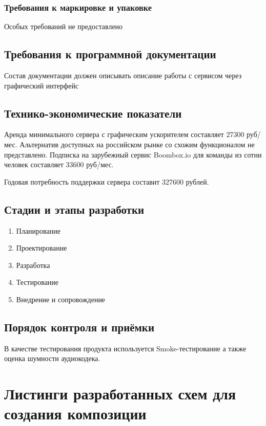 \documentclass[14pt]{extarticle}
\begin{document}
\subsubsection{Требования к маркировке и упаковке}

Особых требований не предоставлено

\subsection{Требования к программной документации}

Состав документации должен описывать описание работы с сервисом через графический интерфейс

\subsection{Технико-экономические показатели}

Аренда минимального сервера с графическим ускорителем составляет 27300 руб/мес.
Альтернатив доступных на российском рынке со схожим функционалом не представлено. Подписка на
зарубежный сервис Boombox.io для команды из сотни человек составляет 33600 руб/мес.

Годовая потребность поддержки сервера составит 327600 рублей.

\subsection{Стадии и этапы разработки}

\begin{enumerate}
	\item Планирование
	\item Проектирование
	\item Разработка
	\item Тестирование
	\item Внедрение и сопровождение
\end{enumerate}

\subsection{Порядок контроля и приёмки}

В качестве тестирования продукта используется Smoke-тестирование а также оценка шумности аудиокодека.

\section{Листинги разработанных схем для создания композиции}
\end{document}
